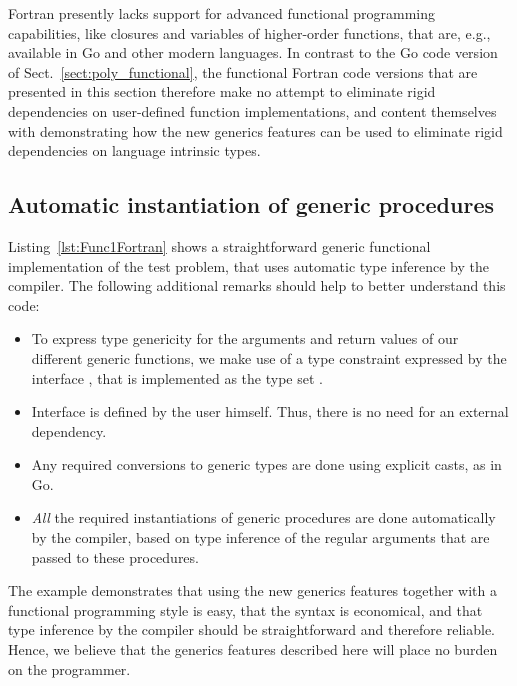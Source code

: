 \documentclass[11pt,oneside]{report}
\newcommand{\code}[1]{{\selectfont\ttfamily{#1}}}
\begin{document}
Fortran presently lacks support for advanced functional programming
capabilities, like closures and variables of higher-order functions,
that are, e.g., available in Go and other modern languages. In
contrast to the Go code version of Sect.~\ref{sect:poly_functional},
the functional Fortran code versions that are presented in this
section therefore make no attempt to eliminate rigid dependencies on
user-defined function implementations, and content themselves with
demonstrating how the new generics features can be used to eliminate
rigid dependencies on language intrinsic types.

\subsection{Automatic instantiation of generic procedures}

Listing~\ref{lst:Func1Fortran} shows a straightforward generic
functional implementation of the test problem, that uses automatic
type inference by the compiler. The following additional remarks
should help to better understand this code:
\begin{itemize}
\item
  To express type genericity for the arguments and return values of our
  different generic functions, we make use of a type constraint
  expressed by the interface \code{INumeric}, that is implemented as the
  type set \code{integer | real(real64)}.
\item
  Interface \code{INumeric} is defined by the user himself. Thus,
  there is no need for an external dependency.
\item
  Any required conversions to generic types are done using explicit
  casts, as in Go.
\item
  \emph{All} the required instantiations of generic procedures are
  done automatically by the compiler, based on type inference of the
  regular arguments that are passed to these procedures.
\end{itemize}



The example demonstrates that using the new generics features together
with a functional programming style is easy, that the syntax is
economical, and that type inference by the compiler should be
straightforward and therefore reliable. Hence, we believe that the
generics features described here will place no burden on the
programmer.
\end{document}
